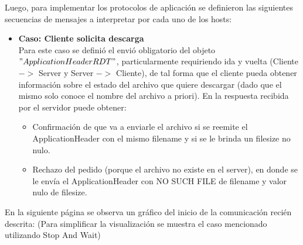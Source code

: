 \documentclass[11pt,a4paper]{article}
\begin{document}
Luego, para implementar los protocolos de aplicación se definieron las siguientes secuencias de mensajes a interpretar por cada uno de los hosts:

\begin{itemize}
    \renewcommand\labelitemi{$->$}
    \item \textbf{Caso: Cliente solicita descarga} \\
    Para este caso se definió el envió obligatorio del objeto $"ApplicationHeaderRDT"$, particularmente requiriendo ida y vuelta (Cliente $->$ Server  y Server $->$ Cliente), de tal forma que el cliente pueda obtener información sobre el estado del archivo que quiere descargar (dado que el mismo solo conoce el nombre del archivo a priori). En la respuesta recibida por el servidor puede obtener:
    \begin{itemize}
        \item Confirmación de que va a enviarle el archivo si se reemite el ApplicationHeader con el mismo filename y si se le brinda un filesize no nulo.
        \item Rechazo del pedido (porque el archivo no existe en el server), en donde se le envía el ApplicationHeader con NO SUCH FILE de filename y valor nulo de filesize.
    \end{itemize}
\end{itemize}

En la siguiente página se observa un gráfico del inicio de la comunicación recién descrita:
(Para simplificar la visualización se muestra el caso mencionado utilizando Stop And Wait)

\newpage
\end{document}

